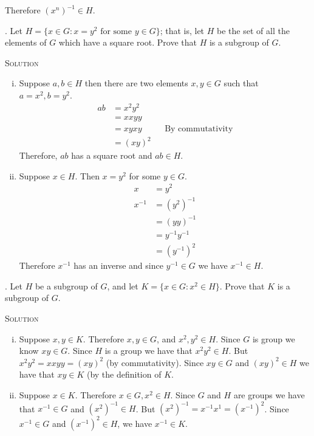 \documentclass[twoside]{amsart}
\newcommand{\solution}{\textsc{Solution}\xspace}
\begin{document}
\begin{enumerate}[A.]
\begin{enumerate}[(i)]
      Therefore $(x^n)^{-1} \in H$.
   \end{enumerate}

   . Let $H=\{x\in G : x = y^2 \text{ for some } y \in G\}$;
   that is, let $H$ be the set of all the elements of $G$ which
   have a square root. Prove that $H$ is a subgroup of $G$.

   \noindent \solution
   \begin{enumerate}[(i)]
      \item Suppose $a,b \in H$ then there are two elements $x,y\in G$
      such that $a=x^2, b=y^2$. 
      \begin{align*}
         ab & = x^2y^2 \\
	    & = xxyy   \\
	    & = xyxy   && \text{By commutativity} \\
	    & = (xy)^2
      \end{align*}
      Therefore, $ab$ has a square root and $ab \in H$.

      \item Suppose $x \in H$. Then $x=y^2$ for some $y \in G$. 
      \begin{align*}
         x & = y^2 \\
	 x^{-1} & = (y^2)^{-1} \\
	        & = (yy)^{-1} \\
		& = y^{-1}y^{-1} \\
		& = (y^{-1})^2
      \end{align*}
      Therefore $x^{-1}$ has an inverse and since $y^{-1}\in G$ 
      we have $x^{-1} \in H$.
   \end{enumerate}

   . Let $H$ be a subgroup of $G$, and let 
   $K = \{x \in G : x^2 \in H\}$. Prove that $K$ is a subgroup of $G$.

   \noindent \solution 
   \begin{enumerate}[(i)]
      \item Suppose $x,y \in K$. Therefore $x,y\in G$, and $x^2,y^2 \in H$.
      Since $G$ is group we know $xy \in G$. Since $H$ is a group we
      have that $x^2y^2 \in H$. But $x^2y^2 = xxyy = (xy)^2$ (by commutativity).
      Since $xy\in G$ and $(xy)^2 \in H$ we have that $xy \in K$ (by
      the definition of $K$.

      \item Suppose $x \in K$. Therefore $x \in G, x^2 \in H$. Since
      $G$ and $H$ are groups we have that $x^{-1} \in G$ and 
      $(x^2)^{-1} \in H$. But $(x^2)^{-1} = x^{-1}x^{1} = (x^{-1})^2$.
      Since $x^{-1} \in G$ and $(x^{-1})^2 \in H$, we have
      $x^{-1} \in K$.
   \end{enumerate}
   


\end{enumerate}
\end{document}
